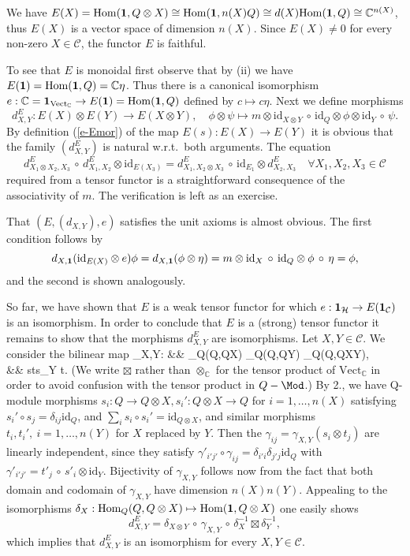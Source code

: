 \documentclass[11pt]{article}
\theoremstyle{definition}
\theoremstyle{definition}
\theoremstyle{remark}
\newcommand{\Vect}{\mathrm{Vect}}
\def\2#1{{\mathcal #1}}
\def\7#1{{\mathbb #1}}
\def\1#1{{\bf #1}}
\newcommand{\Hom}{\mathrm{Hom}}
\newcommand{\mcirc}{\,\circ\,}
\newcommand{\rarr}{\rightarrow}
\def\id{\mathrm{id}}
\newcounter{bean}
\begin{document}
\prf We have $E(X) = \Hom(\11,Q\otimes X)\cong\Hom(\11,n(X)Q)\cong d(X)\Hom(\11,Q)\cong \7C^{n(X)}$,
thus $E(X)$ is a vector space of dimension $n(X)$. Since $E(X)\ne 0$ for every non-zero
$X\in\2C$, the functor $E$ is faithful. 

To see that $E$ is monoidal first observe that by (ii) we have
$E(\11)=\Hom(\11,Q)=\7C\eta$. Thus there is a canonical isomorphism
$e: \7C=\11_{\Vect_\7C} \rarr E(\11 )=\Hom(\11,Q)$ defined by
$c\mapsto c\eta$. Next we define morphisms
\[ d^E_{X,Y}: E(X)\otimes E(Y)\rarr E(X\otimes Y), \quad \phi\otimes \psi\mapsto
   m\otimes\id_{X\otimes Y}\mcirc\id_Q\otimes\phi\otimes\id_Y\mcirc\psi. \]
By definition (\ref{e-Emor}) of the map $E(s): E(X)\rarr E(Y)$ it is obvious that the family
$(d^E_{X,Y})$ is natural w.r.t.\ both arguments. The equation
\[ d^E_{X_1\otimes X_2,X_3}\mcirc  d^E_{X_1,X_2}\otimes\id_{E(X_3)}=
   d^E_{X_1, X_2\otimes X_3}\mcirc \id_{E_1}\otimes d^E_{X_2,X_3}  \quad\forall X_1,X_2,X_3\in\2C
\]  
required from a tensor functor is a straightforward consequence of the associativity of $m$. The
verification is left as an exercise.

That $(E, (d_{X,Y}),e)$ satisfies the unit axioms is almost obvious. The first condition follows by 
\[ d_{X,\11}(\id_{E(X)}\otimes
e)\phi=d_{X,\11}(\phi\otimes\eta)=m\otimes\id_X\mcirc\id_Q\otimes\phi\mcirc\eta=\phi,
\] and the second is shown analogously.

So far, we have shown that $E$ is a weak tensor functor for which $e:
\11_\2H\rarr E(\11_\2C)$ is an isomorphism. In order to conclude that
$E$ is a (strong) tensor functor it remains to show that the morphisms
$d^E_{X,Y}$ are isomorphisms. Let $X,Y\in\2C$. We consider the
bilinear map \bean \gamma_{X,Y}: && \Hom_Q(Q,Q\otimes X)\boxtimes
\Hom_Q(Q,Q\otimes Y)\rarr
\Hom_Q(Q,Q\otimes X\otimes Y), \\
&& s\boxtimes t\mapsto s\otimes\id_Y\mcirc t.  \eean (We write
$\boxtimes$ rather than $\otimes_\7C$ for the tensor product of
$\Vect_\7C$ in order to avoid confusion with the tensor product in
$Q-\Mod$.) By 2., we have Q-module morphisms $s_i: Q\rarr Q\otimes X,
s_i': Q\otimes X\rarr Q$ for $i=1,\ldots,n(X)$ satisfying $s_i'\circ
s_j=\delta_{ij}\id_Q$, and $\sum_i s_i\circ s_i'=\id_{Q\otimes X}$,
and similar morphisms $t_i, t_i', \ i=1,\ldots,n(Y)$ for $X$ replaced
by $Y$. Then the $\gamma_{ij}=\gamma_{X,Y}(s_i\otimes t_j)$ are
linearly independent, since they satisfy
$\gamma'_{i'j'}\circ\gamma_{ij}=\delta_{i'i}\delta_{j'j}\id_Q$ with
$\gamma'_{i'j'}=t'_j \mcirc s'_i\otimes\id_Y$. Bijectivity of
$\gamma_{X,Y}$ follows now from the fact that both domain and codomain
of $\gamma_{X,Y}$ have dimension $n(X)n(Y)$.  Appealing to the
isomorphisms $\delta_X: \Hom_Q(Q,Q\otimes X)\mapsto\Hom(\11,Q\otimes
X)$ one easily shows
\[ d^E_{X,Y}= \delta_{X\otimes Y}\mcirc \gamma_{X,Y} \mcirc \delta_X^{-1} \boxtimes \delta_Y^{-1}, \]
which implies that $d^E_{X,Y}$ is an isomorphism for every $X,Y\in\2C$.
\end{document}
